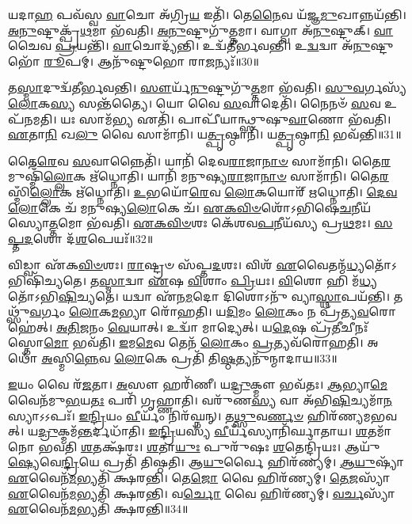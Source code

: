 𑌯𑌦𑌾\-\ul{𑌹} 𑌪𑌵᳴𑌸𑍍𑌵 \ul{𑌵𑌾}\-𑌚𑍋 𑌅᳴𑌗𑍍𑌰𑌿\-\ul{𑌯} 𑌇𑌤𑌿᳴।
𑌤𑍇\-\ul{𑌨𑍈}\-𑌵 𑌯᳴𑌜𑍍𑌞\-\ul{𑌮𑍁}\-𑌖𑌾𑌨𑍍𑌨𑌯᳴𑌨𑍍𑌤𑌿।
\-\ul{𑌅}\-\-\ul{𑌨𑍁}\-𑌷𑍍𑌟𑍁𑌕𑍍𑌪𑍍𑌰᳴\-\ul{𑌥}\-𑌮𑌾 𑌭᳴𑌵𑌤𑌿।
\-\ul{𑌅}\-\-\ul{𑌨𑍁}\-𑌷𑍍𑌟𑍁𑌗𑍁᳴\-\ul{𑌤𑍍𑌤}\-𑌮𑌾।
𑌵𑌾𑌗𑍍𑌵𑌾 𑌅᳴\-\ul{𑌨𑍁}\-𑌷𑍍𑌟𑍁𑌕𑍍।
\-\ul{𑌵𑌾}\-𑌚𑍈𑌵 \ul{𑌪𑍍𑌰}\-𑌯𑌨𑍍𑌤𑌿᳴।
\-\ul{𑌵𑌾}\-𑌚𑍋𑌦𑍍𑌯᳴𑌨𑍍𑌤𑌿।
𑌉𑌦𑍍𑌵᳴𑌤𑍀𑌰𑍍𑌭𑌵𑌨𑍍𑌤𑌿।
𑌉\-\ul{𑌦𑍍𑌵}\-𑌦𑍍𑌵𑌾 𑌅᳴\-\ul{𑌨𑍁}\-𑌷𑍍𑌟𑍁𑌭𑍋᳴ \ul{𑌰𑍂}\-𑌪𑌮𑍍।
𑌆𑌨𑍁᳴𑌷𑍍𑌟𑍁𑌭𑍋 𑌰𑌾\-\ul{𑌜}\-𑌨𑍍𑌯𑌃᳴॥30॥

𑌤\-\ul{𑌸𑍍𑌮𑌾}\-𑌦𑍁𑌦𑍍𑌵᳴𑌤𑍀𑌰𑍍𑌭𑌵𑌨𑍍𑌤𑌿।
\-\ul{𑌸𑍗}\-𑌰𑍍𑌯᳴\-\ul{𑌨𑍁}\-𑌷𑍍𑌟𑍁𑌗𑍁᳴\-\ul{𑌤𑍍𑌤}\-𑌮𑌾 𑌭᳴𑌵𑌤𑌿।
\-\ul{𑌸𑍁}\-\-\ul{𑌵}\-𑌰𑍍𑌗𑌸𑍍𑌯᳴ \ul{𑌲𑍋}\-𑌕\-\ul{𑌸𑍍𑌯} 𑌸𑌨𑍍𑌤᳴𑌤𑍍𑌯𑍈।
𑌯𑍋 𑌵𑍈 \ul{𑌸}\-𑌵𑌾𑌦𑍇𑌤𑌿᳴।
𑌨𑍈𑌨𑍞᳴ \ul{𑌸}\-𑌵 𑌉𑌪᳴𑌨𑌮𑌤𑌿।
𑌯𑌃 𑌸𑌾𑌮᳴\-\ul{𑌭𑍍𑌯} 𑌏𑌤𑌿᳴।
𑌪𑌾𑌪𑍀᳴𑌯𑌾𑌨𑍍𑌥𑍍𑌸𑍁𑌷𑍁\-\ul{𑌵𑌾}\-𑌣𑍋 𑌭᳴𑌵𑌤𑌿।
\-\ul{𑌏}\-𑌤𑌾\-\ul{𑌨𑌿} 𑌖\-\ul{𑌲𑍁} 𑌵𑍈 𑌸𑌾𑌮𑌾᳴𑌨𑌿।
𑌯\-\ul{𑌤𑍍𑌪𑍃}\-𑌷𑍍𑌠𑌾𑌨𑌿᳴।
𑌯\-\ul{𑌤𑍍𑌪𑍃}\-𑌷𑍍𑌠𑌾\-\ul{𑌨𑌿} 𑌭𑌵᳴𑌨𑍍𑌤𑌿॥31॥

𑌤𑍈\-\ul{𑌰𑍇}\-𑌵 \ul{𑌸}\-𑌵𑌾𑌨𑍍𑌨𑍈𑌤𑌿᳴।
𑌯𑌾𑌨𑌿᳴ 𑌦𑍇𑌵\-\ul{𑌰𑌾}\-𑌜𑌾\-\ul{𑌨𑌾}\-\-\ul{𑍞} 𑌸𑌾𑌮𑌾᳴𑌨𑌿।
𑌤𑍈\-\ul{𑌰}\-𑌮𑍁𑌷𑍍𑌮𑌿𑌁᳴\-\ul{𑌲𑍍𑌲𑍋}\-𑌕 𑌋᳴𑌧𑍍𑌨𑍋𑌤𑌿।
𑌯𑌾𑌨𑌿᳴ 𑌮𑌨𑍁𑌷𑍍𑌯\-\ul{𑌰𑌾}\-𑌜𑌾\-\ul{𑌨𑌾}\-\-\ul{𑍞} 𑌸𑌾𑌮𑌾᳴𑌨𑌿।
𑌤𑍈\-\ul{𑌰}\-𑌸𑍍𑌮𑌿𑌁\-\ul{𑌲𑍍𑌲𑍋}\-𑌕 𑌋᳴𑌧𑍍𑌨𑍋𑌤𑌿।
\-\ul{𑌉}\-𑌭𑌯𑍋᳴\-\ul{𑌰𑍇}\-𑌵 \ul{𑌲𑍋}\-𑌕𑌯𑍋𑌰𑍍᳴ 𑌋𑌧𑍍𑌨𑍋𑌤𑌿।
\-\ul{𑌦𑍇}\-\-\ul{𑌵}\-\-\ul{𑌲𑍋}\-𑌕𑍇 𑌚᳴ 𑌮𑌨𑍁𑌷𑍍𑌯\-\ul{𑌲𑍋}\-𑌕𑍇 𑌚᳴।
\-\ul{𑌏}\-\-\ul{𑌕}\-\-\ul{𑌵𑌿}\-\-\ul{𑍞}\-𑌶𑍋᳴\-𑌽𑌭𑌿𑌷𑍇\-\ul{𑌚}\-𑌨𑍀𑌯᳴𑌸𑍍𑌯𑍋\-\ul{𑌤𑍍𑌤}\-𑌮𑍋 𑌭᳴𑌵𑌤𑌿।
\-\ul{𑌏}\-\-\ul{𑌕}\-\-\ul{𑌵𑌿}\-\-\ul{𑍞}\-𑌶𑌃 𑌕𑍇᳴𑌶𑌵\-\ul{𑌪}\-𑌨𑍀𑌯᳴𑌸𑍍𑌯 𑌪𑍍𑌰\-\ul{𑌥}\-𑌮𑌃।
\-\ul{𑌸}\-\-\ul{𑌪𑍍𑌤}\-\-\ul{𑌦}\-𑌶𑍋 𑌦᳴\-\ul{𑌶}\-𑌪𑍇𑌯𑌃᳴॥32॥

𑌵𑌿𑌡𑍍𑌵𑌾 𑌏᳴𑌕\-\ul{𑌵𑌿}\-\-\ul{𑍞}\-𑌶𑌃।
\-\ul{𑌰𑌾}\-𑌷𑍍𑌟𑍍𑌰𑍞 𑌸᳴𑌪𑍍𑌤\-\ul{𑌦}\-𑌶𑌃।
𑌵𑌿𑌶᳴ \ul{𑌏}\-𑌵𑍈𑌤𑌨𑍍𑌮᳴\-\ul{𑌧𑍍𑌯}\-𑌤𑍋᳴\-𑌽𑌭𑌿𑌷𑌿᳴𑌚𑍍𑌯𑌤𑍇।
𑌤\-\ul{𑌸𑍍𑌮𑌾}\-𑌦𑍍𑌵𑌾 \ul{𑌏}\-𑌷 \ul{𑌵𑌿}\-𑌶𑌾𑌂 \ul{𑌪𑍍𑌰𑌿}\-𑌯𑌃।
\-\ul{𑌵𑌿}\-𑌶𑍋 𑌹𑌿 𑌮᳴\-\ul{𑌧𑍍𑌯}\-𑌤𑍋᳴\-𑌽𑌭𑌿\-\ul{𑌷𑌿}\-𑌚𑍍𑌯𑌤𑍇॑।
𑌯𑌦𑍍𑌵𑌾 𑌏᳴𑌨\-\ul{𑌮}\-𑌦𑍋 𑌦𑌿𑌶𑍋𑌽𑌨𑍁᳴ 𑌵𑍍𑌯𑌾\-\ul{𑌸𑍍𑌥𑌾}\-𑌪𑌯᳴𑌨𑍍𑌤𑌿।
𑌤𑌥𑍍𑌸𑍁᳴\-\ul{𑌵}\-𑌰𑍍𑌗𑌂 \ul{𑌲𑍋}\-𑌕\-\ul{𑌮}\-𑌭𑍍𑌯𑌾 𑌰𑍋᳴𑌹𑌤𑌿।
𑌯\-\ul{𑌦𑌿}\-𑌮𑌂 \ul{𑌲𑍋}\-𑌕𑌂 𑌨 𑌪𑍍𑌰᳴𑌤𑍍𑌯\-\ul{𑌵}\-𑌰𑍋𑌹𑍇॑𑌤𑍍।
\-\ul{𑌅}\-\-\ul{𑌤𑌿}\-\-\ul{𑌜}\-𑌨𑌂 \ul{𑌵𑍇}\-𑌯𑌾𑌤𑍍।
𑌉𑌦𑍍𑌵𑌾᳴ 𑌮𑌾𑌦𑍍𑌯𑍇𑌤𑍍।
𑌯\-\ul{𑌦𑍇}\-𑌷 𑌪𑍍𑌰᳴\-\ul{𑌤𑍀}\-𑌚𑍀𑌨𑌃᳴ 𑌸𑍍𑌤𑍋\-\ul{𑌮𑍋} 𑌭𑌵᳴𑌤𑌿।
\-\ul{𑌇}\-𑌮\-\ul{𑌮𑍇}\-𑌵 𑌤𑍇𑌨᳴ \ul{𑌲𑍋}\-𑌕𑌂 \ul{𑌪𑍍𑌰}\-𑌤𑍍𑌯𑌵᳴𑌰𑍋𑌹𑌤𑌿।
𑌅𑌥𑍋᳴ \ul{𑌅}\-𑌸𑍍𑌮𑌿\-\ul{𑌨𑍍𑌨𑍇}\-𑌵 \ul{𑌲𑍋}\-𑌕𑍇 𑌪𑍍𑌰𑌤𑌿᳴ 𑌤𑌿\-\ul{𑌷𑍍𑌠}\-𑌤𑍍𑌯𑌨𑍁᳴𑌨𑍍𑌮𑌾𑌦𑌾𑌯॥33॥\anuvakamend[𑌅𑌕𑍍𑌰᳴𑌨𑍍𑌰𑌾\-\ul{𑌜}\-𑌨𑍍𑌯𑍋᳴ 𑌭𑌵᳴𑌨𑍍𑌤𑌿 𑌦\-\ul{𑌶}\-𑌪𑍇𑌯𑍋᳴ 𑌮𑌾\-\ul{𑌦𑍍𑌯𑍇}\-𑌤𑍍𑌤𑍍𑌰𑍀𑌣𑌿᳴ 𑌚]

\-\ul{𑌇}\-𑌯𑌂 𑌵𑍈 𑌰᳴\-\ul{𑌜}\-𑌤𑌾।
\-\ul{𑌅}\-𑌸𑍗 𑌹𑌰𑌿᳴𑌣𑍀।
𑌯\-\ul{𑌦𑍍𑌰𑍁}\-𑌕𑍍𑌮𑍗 𑌭𑌵᳴𑌤𑌃।
\-\ul{𑌆}\-𑌭𑍍𑌯𑌾\-\ul{𑌮𑍇}\-𑌵𑍈𑌨᳴𑌮𑍁\-\ul{𑌭}\-𑌯\-\ul{𑌤𑌃} 𑌪𑌰𑌿᳴ 𑌗𑍃𑌹𑍍𑌣𑌾𑌤𑌿।
𑌵𑌰𑍁᳴𑌣\-\ul{𑌸𑍍𑌯} 𑌵𑌾 𑌅᳴𑌭𑌿\-\ul{𑌷𑌿}\-𑌚𑍍𑌯𑌮𑌾᳴\-\ul{𑌨}\-𑌸𑍍𑌯𑌾\-𑌽𑌽𑌪𑌃᳴।
\-\ul{𑌇}\-\-\ul{𑌨𑍍𑌦𑍍𑌰𑌿}\-𑌯𑌂 \ul{𑌵𑍀}\-𑌰𑍍𑌯𑌂᳴ 𑌨𑌿𑌰᳴𑌘𑍍𑌨𑌨𑍍।
𑌤\-\ul{𑌥𑍍𑌸𑍁}\-𑌵\-\ul{𑌰𑍍𑌣}\-\-\ul{𑍞} 𑌹𑌿𑌰᳴𑌣𑍍𑌯𑌮𑌭𑌵𑌤𑍍।
𑌯\-\ul{𑌦𑍍𑌰𑍁}\-𑌕𑍍𑌮𑌮᳴\-\ul{𑌨𑍍𑌤}\-𑌰𑍍𑌦\-𑌧𑌾᳴𑌤𑌿।
\-\ul{𑌇}\-\-\ul{𑌨𑍍𑌦𑍍𑌰𑌿}\-𑌯𑌸𑍍𑌯᳴ \ul{𑌵𑍀}\-𑌰𑍍𑌯᳴𑌸𑍍𑌯𑌾\-𑌨𑌿᳴𑌰𑍍𑌘𑌾𑌤𑌾𑌯।
\-\ul{𑌶}\-𑌤𑌮𑌾᳴𑌨𑍋 𑌭𑌵𑌤𑌿 \ul{𑌶}\-𑌤𑌕𑍍𑌷᳴𑌰𑌃।
\-\ul{𑌶}\-𑌤𑌾\-\ul{𑌯𑍁𑌃} 𑌪𑍁𑌰𑍁᳴𑌷𑌃 \ul{𑌶}\-𑌤𑍇𑌨𑍍𑌦𑍍𑌰𑌿᳴𑌯𑌃।
𑌆𑌯𑍁᳴\-\ul{𑌷𑍍𑌯𑍇}\-𑌵𑍇\-\ul{𑌨𑍍𑌦𑍍𑌰𑌿}\-𑌯𑍇 𑌪𑍍𑌰𑌤𑌿᳴ 𑌤𑌿𑌷𑍍𑌠𑌤𑌿।
𑌆\-\ul{𑌯𑍁}\-𑌰𑍍𑌵𑍈 𑌹𑌿𑌰᳴𑌣𑍍𑌯𑌮𑍍।
\-\ul{𑌆}\-\-\ul{𑌯𑍁}\-𑌷𑍍𑌯𑌾᳴ \ul{𑌏}\-𑌵𑍈𑌨᳴\-\ul{𑌮}\-𑌭𑍍𑌯𑌤𑌿᳴ 𑌕𑍍𑌷𑌰𑌨𑍍𑌤𑌿।
𑌤𑍇\-\ul{𑌜𑍋} 𑌵𑍈 𑌹𑌿𑌰᳴𑌣𑍍𑌯𑌮𑍍।
\-\ul{𑌤𑍇}\-\-\ul{𑌜}\-𑌸𑍍𑌯𑌾᳴ \ul{𑌏}\-𑌵𑍈𑌨᳴\-\ul{𑌮}\-𑌭𑍍𑌯𑌤𑌿᳴ 𑌕𑍍𑌷𑌰𑌨𑍍𑌤𑌿।
𑌵\-\ul{𑌰𑍍𑌚𑍋} 𑌵𑍈 𑌹𑌿𑌰᳴𑌣𑍍𑌯𑌮𑍍।
\-\ul{𑌵}\-\-\ul{𑌰𑍍𑌚}\-𑌸𑍍𑌯𑌾᳴ \ul{𑌏}\-𑌵𑍈𑌨᳴\-\ul{𑌮}\-𑌭𑍍𑌯𑌤𑌿᳴ 𑌕𑍍𑌷𑌰𑌨𑍍𑌤𑌿॥34॥\anuvakamend[\-\ul{𑌶}\-𑌤𑌕𑍍𑌷᳴\-\ul{𑌰𑍋}\-\-𑌽𑌷𑍍𑌟𑍗 𑌚᳴]

